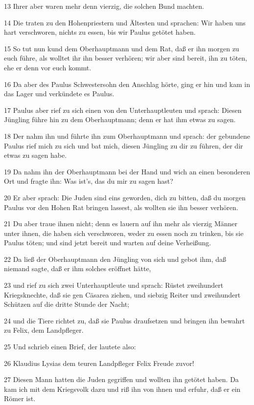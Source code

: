 \par 13 Ihrer aber waren mehr denn vierzig, die solchen Bund machten.
\par 14 Die traten zu den Hohenpriestern und Ältesten und sprachen: Wir haben uns hart verschworen, nichts zu essen, bis wir Paulus getötet haben.
\par 15 So tut nun kund dem Oberhauptmann und dem Rat, daß er ihn morgen zu euch führe, als wolltet ihr ihn besser verhören; wir aber sind bereit, ihn zu töten, ehe er denn vor euch kommt.
\par 16 Da aber des Paulus Schwestersohn den Anschlag hörte, ging er hin und kam in das Lager und verkündete es Paulus.
\par 17 Paulus aber rief zu sich einen von den Unterhauptleuten und sprach: Diesen Jüngling führe hin zu dem Oberhauptmann; denn er hat ihm etwas zu sagen.
\par 18 Der nahm ihn und führte ihn zum Oberhauptmann und sprach: der gebundene Paulus rief mich zu sich und bat mich, diesen Jüngling zu dir zu führen, der dir etwas zu sagen habe.
\par 19 Da nahm ihn der Oberhauptmann bei der Hand und wich an einen besonderen Ort und fragte ihn: Was ist's, das du mir zu sagen hast?
\par 20 Er aber sprach: Die Juden sind eins geworden, dich zu bitten, daß du morgen Paulus vor den Hohen Rat bringen lassest, als wollten sie ihn besser verhören.
\par 21 Du aber traue ihnen nicht; denn es lauern auf ihn mehr als vierzig Männer unter ihnen, die haben sich verschworen, weder zu essen noch zu trinken, bis sie Paulus töten; und sind jetzt bereit und warten auf deine Verheißung.
\par 22 Da ließ der Oberhauptmann den Jüngling von sich und gebot ihm, daß niemand sagte, daß er ihm solches eröffnet hätte,
\par 23 und rief zu sich zwei Unterhauptleute und sprach: Rüstet zweihundert Kriegsknechte, daß sie gen Cäsarea ziehen, und siebzig Reiter und zweihundert Schützen auf die dritte Stunde der Nacht;
\par 24 und die Tiere richtet zu, daß sie Paulus draufsetzen und bringen ihn bewahrt zu Felix, dem Landpfleger.
\par 25 Und schrieb einen Brief, der lautete also:
\par 26 Klaudius Lysias dem teuren Landpfleger Felix Freude zuvor!
\par 27 Diesen Mann hatten die Juden gegriffen und wollten ihn getötet haben. Da kam ich mit dem Kriegsvolk dazu und riß ihn von ihnen und erfuhr, daß er ein Römer ist.
